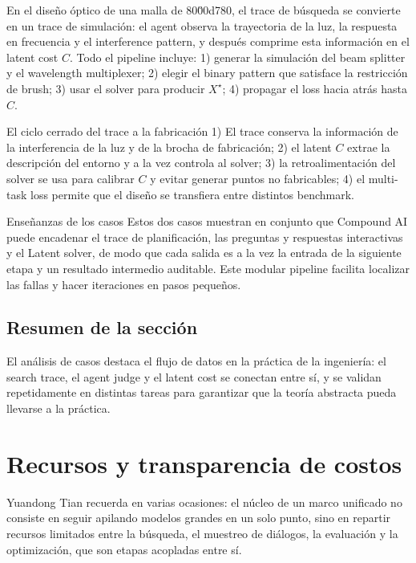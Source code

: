\documentclass[a4paper]{article}
\begin{document}
En el diseño óptico de una malla de 80\u00d780, el trace de búsqueda se convierte en un trace de simulación: el agent observa la trayectoria de la luz, la respuesta en frecuencia y el interference pattern, y después comprime esta información en el latent cost \(C\). Todo el pipeline incluye: 1) generar la simulación del beam splitter y el wavelength multiplexer; 2) elegir el binary pattern que satisface la restricción de brush; 3) usar el solver para producir \(X^\star\); 4) propagar el loss hacia atrás hasta \(C\).
\begin{importantbox}{El ciclo cerrado del trace a la fabricación}
1) El trace conserva la información de la interferencia de la luz y de la brocha de fabricación; 2) el latent \(C\) extrae la descripción del entorno y a la vez controla al solver; 3) la retroalimentación del solver se usa para calibrar \(C\) y evitar generar puntos no fabricables; 4) el multi-task loss permite que el diseño se transfiera entre distintos benchmark.
\end{importantbox}
\begin{knowledgebox}{Enseñanzas de los casos}
Estos dos casos muestran en conjunto que Compound AI puede encadenar el trace de planificación, las preguntas y respuestas interactivas y el Latent solver, de modo que cada salida es a la vez la entrada de la siguiente etapa y un resultado intermedio auditable. Este modular pipeline facilita localizar las fallas y hacer iteraciones en pasos pequeños.
\end{knowledgebox}

\subsection{Resumen de la sección}

El análisis de casos destaca el flujo de datos en la práctica de la ingeniería: el search trace, el agent judge y el latent cost se conectan entre sí, y se validan repetidamente en distintas tareas para garantizar que la teoría abstracta pueda llevarse a la práctica.

\section{Recursos y transparencia de costos}

Yuandong Tian recuerda en varias ocasiones: el núcleo de un marco unificado no consiste en seguir apilando modelos grandes en un solo punto, sino en repartir recursos limitados entre la búsqueda, el muestreo de diálogos, la evaluación y la optimización, que son etapas acopladas entre sí.
\end{document}
